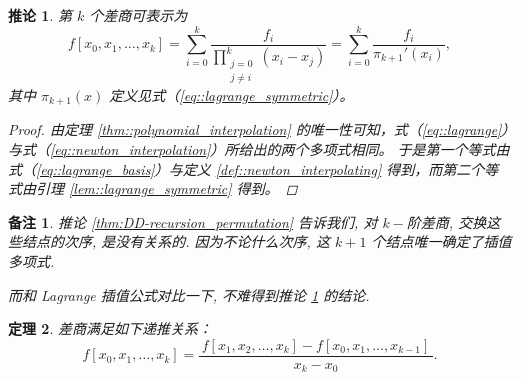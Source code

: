 \documentclass[a4paper]{ctexart}
\newtheorem{theorem}{定理}
\newtheorem{remark}{备注}
\newtheorem{corollary}[theorem]{推论}
\numberwithin{theorem}{section}
\numberwithin{equation}{section}
\numberwithin{figure}{section}
\numberwithin{remark}{section}
\begin{document}
\begin{corollary}
    \label{cor::newton_explicit}
第 $k$ 个差商可表示为
\begin{equation}
    \label{eq::newton_explicit}
f[x_0,x_1,\ldots,x_k]
=\sum_{i=0}^{k}\frac{f_i}{\displaystyle\prod_{\substack{j=0\\ j\ne i}}^{k}(x_i-x_j)}
=\sum_{i=0}^{k}\frac{f_i}{\pi_{k+1}'(x_i)},
\end{equation}
其中 $\pi_{k+1}(x)$ 定义见式（\ref{eq::lagrange_symmetric}）。
\begin{proof}
由定理 \ref{thm::polynomial_interpolation} 的唯一性可知，式（\ref{eq::lagrange}）与式（\ref{eq::newton_interpolation}）所给出的两个多项式相同。
于是第一个等式由式（\ref{eq::lagrange_basis}）与定义 \ref{def::newton_interpolating} 得到，而第二个等式由引理 \ref{lem::lagrange_symmetric} 得到。
\end{proof}
\end{corollary}


\begin{remark}
推论 \ref{thm:DD-recursion_permutation} 告诉我们, 对 $k-$阶差商, 交换这些结点的次序, 是没有关系的. 因为不论什么次序,
这 $k + 1$ 个结点唯一确定了插值多项式.

而和 Lagrange 插值公式对比一下, 不难得到推论 \ref{cor::newton_explicit} 的结论.


    
\end{remark}


\begin{theorem}
    \label{thm:DD-recursion}
差商满足如下递推关系：
\begin{equation}
    \label{eq::DD-recursion}
f[x_0,x_1,\ldots,x_k]
=\frac{\,f[x_1,x_2,\ldots,x_k]-f[x_0,x_1,\ldots,x_{k-1}]\,}{x_k-x_0}.
\end{equation}
\end{theorem}
\end{document}

